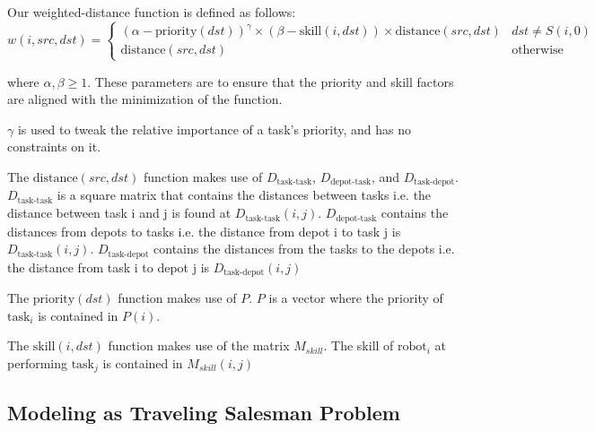 \documentclass[a4paper]{article}
\begin{document}
Our weighted-distance function is defined as follows:
$$
w(i, \mathit{src}, \mathit{dst}) = \begin{cases}
(\alpha - \text{priority}(\mathit{dst}))^\gamma \times (\beta - \text{skill}(i, \mathit{dst})) \times \text{distance}(\mathit{src}, \mathit{dst}) & \mathit{dst} \ne S(i,0) \\
\text{distance}(\mathit{src}, \mathit{dst}) & \text{otherwise}
\end{cases}
$$

where $\alpha, \beta \geq 1$. These parameters are to ensure that the priority and skill factors are aligned with the minimization of the function.

$\gamma$ is used to tweak the relative importance of a task's priority, and has no constraints on it.

The $\text{distance}(\mathit{src}, \mathit{dst})$ function makes use of $D_\text{task-task}$, $D_\text{depot-task}$, and $D_\text{task-depot}$. $D_\text{task-task}$ is a square matrix that contains the distances between tasks i.e. the distance between task i and j is found at $D_\text{task-task}(i,j)$. $D_\text{depot-task}$ contains the distances from depots to tasks i.e. the distance from depot i to task j is $D_\text{task-task}(i,j)$. $D_\text{task-depot}$ contains the distances from the tasks to the depots i.e. the distance from task i to depot j is $D_\text{task-depot}(i,j)$

The $\text{priority}(\mathit{dst})$ function makes use of $P$. $P$ is a vector where the priority of $\text{task}_i$ is contained in $P(i)$.

The $\text{skill}(i, \mathit{dst})$ function makes use of the matrix $M_{skill}$. The skill of $\text{robot}_i$ at performing $\text{task}_j$ is contained in $M_{skill}(i,j)$

\subsection{Modeling as Traveling Salesman Problem}

\end{document}
